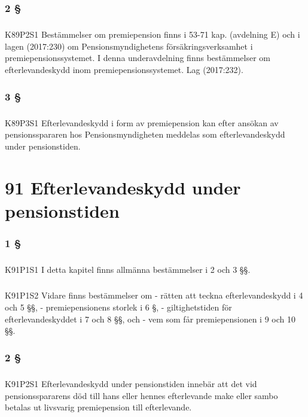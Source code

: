 \documentclass[a4paper,notitlepage,openany,10pt]{book}
\begin{document}
\subsection*{2 §}
\paragraph*{}
{\tiny K89P2S1}
Bestämmelser om premiepension finns i 53-71 kap. (avdelning E) och i lagen (2017:230) om Pensionsmyndighetens försäkringsverksamhet i premiepensionssystemet. I denna underavdelning finns bestämmelser om efterlevandeskydd inom premiepensionssystemet.
Lag (2017:232).
\subsection*{3 §}
\paragraph*{}
{\tiny K89P3S1}
Efterlevandeskydd i form av premiepension kan efter ansökan av pensionsspararen hos Pensionsmyndigheten meddelas som efterlevandeskydd under pensionstiden.
\chapter*{91 Efterlevandeskydd under pensionstiden}
\subsection*{1 §}
\paragraph*{}
{\tiny K91P1S1}
I detta kapitel finns allmänna bestämmelser i 2 och 3 §§.
\paragraph*{}
{\tiny K91P1S2}
Vidare finns bestämmelser om
\newline - rätten att teckna efterlevandeskydd i 4 och 5 §§,
\newline - premiepensionens storlek i 6 §,
\newline - giltighetstiden för efterlevandeskyddet i 7 och 8 §§, och
\newline - vem som får premiepensionen i 9 och 10 §§.
\subsection*{2 §}
\paragraph*{}
{\tiny K91P2S1}
Efterlevandeskydd under pensionstiden innebär att det vid pensionsspararens död till hans eller hennes efterlevande make eller sambo betalas ut livsvarig premiepension till efterlevande.
\end{document}
